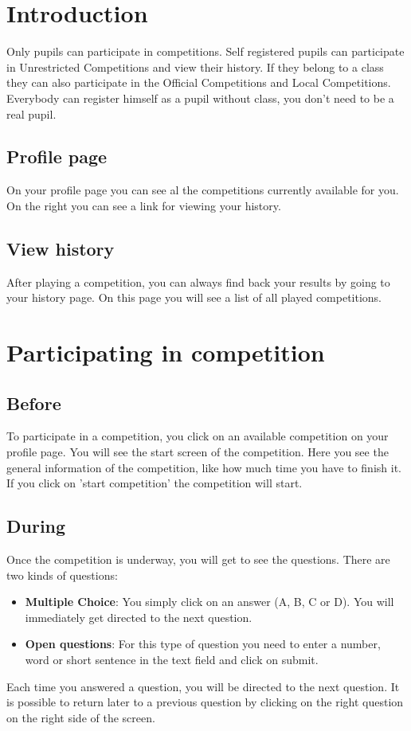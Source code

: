 \documentclass[11pt,a4paper]{report}
\begin{document}
\section{Introduction}
Only pupils can participate in competitions. Self registered pupils can participate in Unrestricted Competitions and view their history. If they belong to a class they can also participate in the Official Competitions and Local Competitions. Everybody can register himself as a pupil without class, you don't need to be a real pupil. 
\subsection{Profile page}
On your profile page you can see al the competitions currently available for you. On the right you can see a link for viewing your history.
\subsection{View history}
After playing a competition, you can always find back your results by going to your history page. On this page you will see a list of all played competitions.

\section{Participating in competition}
\subsection{Before}
To participate in a competition, you click on an available competition on your profile page. You will see the start screen of the competition. Here you see the general information of the competition, like how much time you have to finish it. If you click on 'start competition' the competition will start.
\subsection{During}
Once the competition is underway, you will get to see the questions. There are two kinds of questions:
\begin{itemize}
\item \textbf{Multiple Choice}: You simply click on an answer (A, B, C or D). You will immediately get directed to the next question. 
\item \textbf{Open questions}: For this type of question you need to enter a number, word or short sentence in the text field and click on submit.
\end{itemize}
Each time you answered a question, you will be directed to the next question. It is possible to return later to a previous question by clicking on the right question on the right side of the screen.
\end{document}
